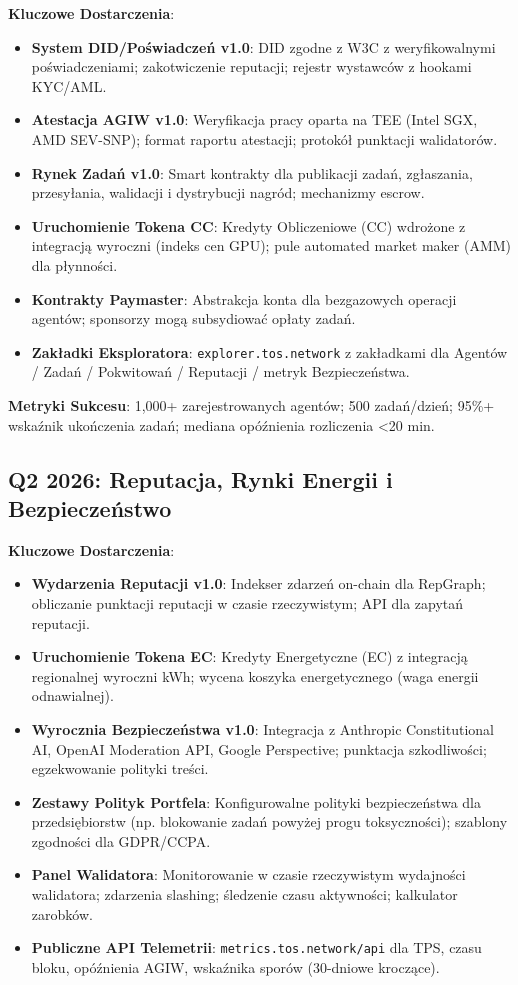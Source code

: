 \documentclass[11pt]{article}
\begin{document}
\textbf{Kluczowe Dostarczenia}:
\begin{itemize}[noitemsep]
  \item \textbf{System DID/Poświadczeń v1.0}: DID zgodne z W3C z weryfikowalnymi poświadczeniami; zakotwiczenie reputacji; rejestr wystawców z hookami KYC/AML.
  \item \textbf{Atestacja AGIW v1.0}: Weryfikacja pracy oparta na TEE (Intel SGX, AMD SEV-SNP); format raportu atestacji; protokół punktacji walidatorów.
  \item \textbf{Rynek Zadań v1.0}: Smart kontrakty dla publikacji zadań, zgłaszania, przesyłania, walidacji i dystrybucji nagród; mechanizmy escrow.
  \item \textbf{Uruchomienie Tokena CC}: Kredyty Obliczeniowe (CC) wdrożone z integracją wyroczni (indeks cen GPU); pule automated market maker (AMM) dla płynności.
  \item \textbf{Kontrakty Paymaster}: Abstrakcja konta dla bezgazowych operacji agentów; sponsorzy mogą subsydiować opłaty zadań.
  \item \textbf{Zakładki Eksploratora}: \texttt{explorer.tos.network} z zakładkami dla Agentów / Zadań / Pokwitowań / Reputacji / metryk Bezpieczeństwa.
\end{itemize}

\textbf{Metryki Sukcesu}: 1,000+ zarejestrowanych agentów; 500 zadań/dzień; 95\%+ wskaźnik ukończenia zadań; mediana opóźnienia rozliczenia <20 min.

\subsection{Q2 2026: Reputacja, Rynki Energii i Bezpieczeństwo}

\textbf{Kluczowe Dostarczenia}:
\begin{itemize}[noitemsep]
  \item \textbf{Wydarzenia Reputacji v1.0}: Indekser zdarzeń on-chain dla RepGraph; obliczanie punktacji reputacji w czasie rzeczywistym; API dla zapytań reputacji.
  \item \textbf{Uruchomienie Tokena EC}: Kredyty Energetyczne (EC) z integracją regionalnej wyroczni kWh; wycena koszyka energetycznego (waga energii odnawialnej).
  \item \textbf{Wyrocznia Bezpieczeństwa v1.0}: Integracja z Anthropic Constitutional AI, OpenAI Moderation API, Google Perspective; punktacja szkodliwości; egzekwowanie polityki treści.
  \item \textbf{Zestawy Polityk Portfela}: Konfigurowalne polityki bezpieczeństwa dla przedsiębiorstw (np. blokowanie zadań powyżej progu toksyczności); szablony zgodności dla GDPR/CCPA.
  \item \textbf{Panel Walidatora}: Monitorowanie w czasie rzeczywistym wydajności walidatora; zdarzenia slashing; śledzenie czasu aktywności; kalkulator zarobków.
  \item \textbf{Publiczne API Telemetrii}: \texttt{metrics.tos.network/api} dla TPS, czasu bloku, opóźnienia AGIW, wskaźnika sporów (30-dniowe kroczące).
\end{itemize}
\end{document}
